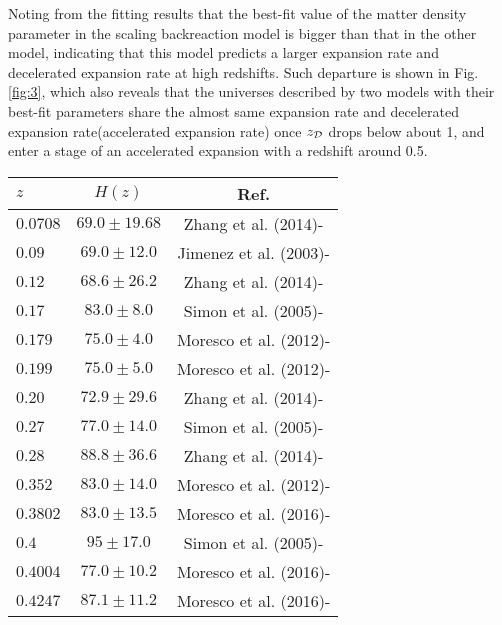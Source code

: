 \documentclass[preprint,preprintnumbers, prd, floatfix,  superscriptaddress,nofootinbib] {revtex4-1}
\newcommand{\CD}{{\cal D}}
\begin{document}
Noting from the fitting results that the best-fit value of the matter density parameter in the scaling backreaction model is bigger than that in the other model, indicating that this model predicts a larger expansion rate and decelerated expansion rate at high redshifts. Such departure is shown in Fig.\ref{fig:3}, which also reveals that the universes described by two models with their best-fit parameters share the almost same expansion rate and decelerated expansion rate(accelerated expansion rate) once $z_{\CD}$ drops below about 1, and enter a stage of an accelerated expansion with a redshift around 0.5.


\begin{table}
\centering
\begin{tabular}{|lcc|}
\hline
{$z$}   & $H(z)$ &  Ref.\\
\hline
$0.0708$   &  $69.0\pm19.68$         &  Zhang et al. (2014)-\cite{Zhang2014}   \\
    $0.09$       &  $69.0\pm12.0$            &  Jimenez et al. (2003)-\cite{Jimenez2003}   \\
    $0.12$       &  $68.6\pm26.2$           &  Zhang et al. (2014)-\cite{Zhang2014}  \\
    $0.17$       &  $83.0\pm8.0$             &  Simon et al. (2005)-\cite{Simon2005}     \\
    $0.179$     &  $75.0\pm4.0$           &  Moresco et al. (2012)-\cite{Moresco2012}     \\
    $0.199$     &  $75.0\pm5.0$            &  Moresco et al. (2012)-\cite{Moresco2012}     \\
    $0.20$         &  $72.9\pm29.6$         &  Zhang et al. (2014)-\cite{Zhang2014}   \\
    $0.27$       &  $77.0\pm14.0$         &    Simon et al. (2005)-\cite{Simon2005}   \\
    $0.28$       &  $88.8\pm36.6$        &  Zhang et al. (2014)-\cite{Zhang2014}   \\
    $0.352$     &  $83.0\pm14.0$          &  Moresco et al. (2012)-\cite{Moresco2012}   \\
    $0.3802$     &  $83.0\pm13.5$         &  Moresco et al. (2016)-\cite{Moresco2016}   \\
    $0.4$         &  $95\pm17.0$             &  Simon et al. (2005)-\cite{Simon2005}     \\
    $0.4004$     &  $77.0\pm10.2$          &  Moresco et al. (2016)-\cite{Moresco2016}   \\
    $0.4247$     &  $87.1\pm11.2$         &  Moresco et al. (2016)-\cite{Moresco2016}   \\

\end{tabular}
\end{table}
\end{document}
